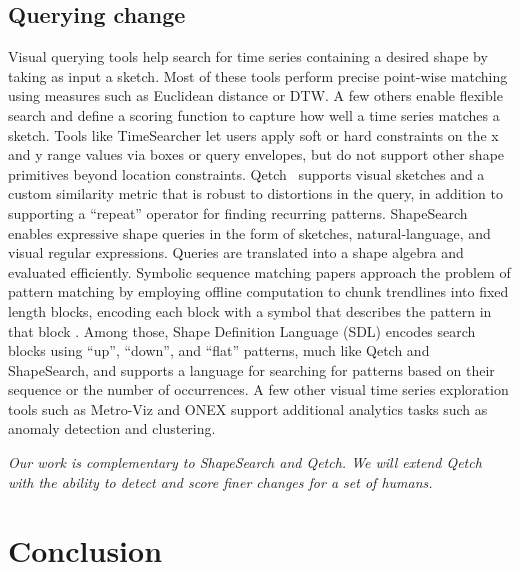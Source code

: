 \documentclass[11pt]{article}
\begin{document}
\subsection{Querying change}
Visual querying tools \cite{mohebbi2011google, 7883518,10.1145/1056808.1057017, DBLP:journals/corr/SiddiquiKLKP16, DBLP:conf/chi/Wattenberg01} help search for time series containing a desired shape by taking as input a sketch. Most of these tools perform precise point-wise matching using measures such as Euclidean distance or DTW. A few others enable flexible search and define a scoring function to capture how well a time series matches a sketch. Tools like TimeSearcher \cite{aris2005timesearcher} let users apply soft or hard constraints on the x and y range values via boxes or query envelopes, but do not support other shape primitives beyond location constraints. Qetch~\cite{DBLP:conf/sigmod/ManninoA18} supports visual sketches and a custom similarity metric that is robust to distortions in the query, in addition to supporting a “repeat” operator for finding recurring patterns. ShapeSearch~\cite{DBLP:conf/sigmod/SiddiquiLWKP20}  enables expressive shape queries in the form of sketches, natural-language, and visual regular expressions. Queries are translated into a shape algebra and evaluated efficiently. Symbolic sequence matching papers approach the problem of pattern matching by employing offline computation to chunk trendlines into fixed length blocks, encoding each block with a symbol that describes the pattern in that block \cite{DBLP:conf/vldb/AgrawalPWZ95,DBLP:conf/sigmod/FaloutsosRM94,DBLP:conf/vldb/GarofalakisRS99, DBLP:conf/vldb/AgrawalLSS95, DBLP:journals/corr/abs-1904-09262}. Among those, Shape Definition Language (SDL) \cite{DBLP:conf/vldb/AgrawalPWZ95} encodes search blocks using “up”, “down”, and “flat” patterns, much like Qetch and ShapeSearch, and supports a language for searching for patterns based on their sequence or the number of occurrences. A few other visual time series exploration tools such as Metro-Viz \cite{DBLP:conf/sigmod/EichmannSTZ19} and ONEX  \cite{DBLP:conf/sigmod/NeamtuALNRS17} support additional analytics tasks such as anomaly detection and clustering.  

{\em Our work is complementary to ShapeSearch and Qetch. We will extend Qetch with the ability to detect and score finer changes for a set of humans.}

\section{Conclusion}
\end{document}
